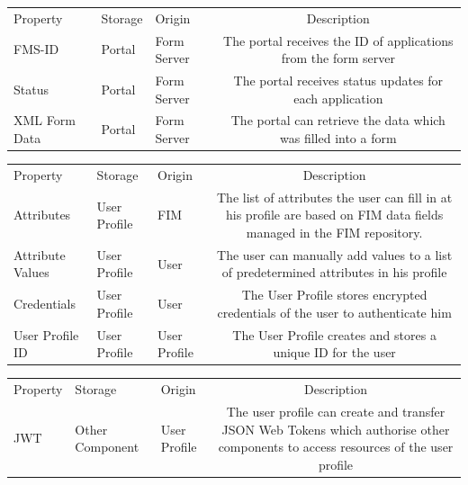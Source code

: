 \documentclass[
     12pt,         %
     a4paper,      %
     BCOR=10mm,version=first,     %
     DIV=14,version=first,        %
     ]{scrreprt}
\begin{document}
\begin{table}[!h]
    \begin{tabularx}{\textwidth}{|l|l|l|C|}
    \hline
     \\
    \hline
    Property & Storage & Origin & Description  \\
    \hline
    \hline
    FMS-ID & Portal & Form Server & The portal receives the ID of applications from the form server \\
    \hline
    Status & Portal & Form Server & The portal receives status updates for each application \\
    \hline
    XML Form Data & Portal & Form Server & The portal can retrieve the data which was filled into a form \\
    \hline
    \end{tabularx}
\end{table}

\begin{table}[!h]
    \begin{tabularx}{\textwidth}{|l|l|l|C|}
    \hline
     \\
    \hline
    Property & Storage & Origin & Description  \\
    \hline
    \hline
    Attributes & User Profile & FIM & The list of attributes the user can fill in at his profile are based on FIM data fields managed in the FIM repository. \\
    \hline
    Attribute Values & User Profile & User & The user can manually add values to a list of predetermined attributes in his profile \\
    \hline
    Credentials & User Profile & User & The User Profile stores encrypted credentials of the user to authenticate him \\
    \hline
    User Profile ID & User Profile & User Profile & The User Profile creates and stores a unique ID for the user \\
    \hline
    \end{tabularx}
\end{table}

\begin{table}[!h]
    \begin{tabularx}{\textwidth}{|l|l|l|C|}
    \hline
     \\
    \hline
    Property & Storage & Origin & Description  \\
    \hline
    \hline
    JWT & Other Component & User Profile & The user profile can create and transfer JSON Web Tokens which authorise other components to access resources of the user profile \\
    \hline
    \end{tabularx}
\end{table}
\end{document}
